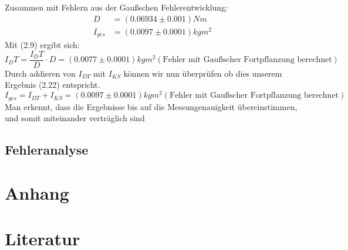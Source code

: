 \documentclass[11pt,a4paper]{article}
\begin{document}
	Zusammen mit Fehlern aus der Gaußschen Fehlerentwicklung:
	\begin{align}
	D&=(0.06934 \pm 0.001) Nm \\
	I_{ges}&=(0.0097 \pm 0.0001)kgm^2
	\end{align}
	Mit (2.9) ergibt sich:
	\begin{equation}
	I_DT=\frac{I_DT}{D} \cdot D =(0.0077 \pm 0.0001)kgm^2 (\text{Fehler mit Gaußscher Fortpflanzung berechnet})
	\end{equation}
	\vspace{0.5 ex}Durch addieren von $I_{DT}$ mit $I_{KS}$ können wir nun überprüfen ob dies unserem Ergebnis (2.22)
	entspricht.
	\begin{equation}
	I_{ges}=I_{DT}+I_{KS}=(0.0097 \pm 0.0001)kgm^2 (\text{Fehler mit Gaußscher Fortpflanzung berechnet})
	\end{equation}
	Man erkennt, dass die Ergebnisse bis auf die Messungenauigkeit übereinstimmen, und somit miteinander verträglich sind
	














\subsection{Fehleranalyse}




\newpage
\section{Anhang}
%

\nocite{*}
\newpage
\section{Literatur}
\newpage
%
\end{document}
